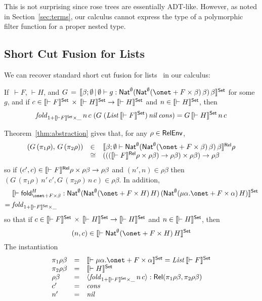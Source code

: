 \documentclass{lmcs}
\theoremstyle{plain}\newtheorem{satz}[thm]{Satz}
\newcommand{\fold}{\mathsf{fold}}
\begin{document}
\noindent
This is not surprising since rose trees are essentially
ADT-like. However, as noted in Section~\ref{sec:terms}, our calculus
cannot express the type of a polymorphic filter function for a proper
nested type.

\subsection{Short Cut Fusion for Lists}\label{sec:short-cut}

We can recover standard short cut fusion for lists~\cite{glp93} in our
calculus: 
\begin{thm}
If \,$\vdash F$, $\vdash H$, and 
$G \, = \, \setsem{\beta; \emptyset \,|\, \emptyset \vdash g :
  \Nat^{\emptyset} (\Nat^{\emptyset} (\onet + F \times \beta)\,
  \beta)\, \beta}$ for some $g$, and if $c \in \llbracket{\vdash F}\rrbracket^{\mathsf{Set}}
\,\times\, \llbracket{\vdash H}\rrbracket^{\mathsf{Set}} \to \llbracket{\vdash H}\rrbracket^{\mathsf{Set}}$ and $n \in
\llbracket{\vdash H}\rrbracket^{\mathsf{Set}}$, then
\[\mathit{fold}_{1 + \llbracket{\vdash F}\rrbracket^{\mathsf{Set}} \times \_}\, n\, c\; (G\; (\mathit{List}\,
\llbracket{\vdash F}\rrbracket^{\mathsf{Set}})\,\mathit{nil} \,\mathit{cons}) = G \,\llbracket{\vdash
  H}\rrbracket^{\mathsf{Set}}\, n\, c \]
\end{thm}
\proof
Theorem~\ref{thm:abstraction} gives
that, for any $\rho \in \mathsf{RelEnv}$,
\[\begin{array}{lll}
(G \,(\pi_1 \rho), \,G\, (\pi_2 \rho)) & \in 
& \relsem{\beta; \emptyset \vdash \Nat^{\emptyset} (\Nat^{\emptyset}
  (\onet + F \times \beta)\, \beta)\, \beta} \rho \\
& \cong & (((\relsem{\vdash F} \rho \times
\rho\beta) \to \rho\beta) \times \rho\beta) \to \rho\beta
\end{array}\]
so if $(c', c) \in \llbracket{\vdash F}\rrbracket^{\mathsf{Rel}} \rho \times
\rho\beta \to \rho\beta$ and $(n', n) \in \rho\beta$ then
$(G \,(\pi_1 \rho)\, n'\, c', G\, (\pi_2 \rho)\, n\, c)
\in \rho \beta$.
In addition,
\begin{align*}
  &\setsem{\vdash \fold_{\onet + F
    \times \beta}^{H} : \Nat^{\emptyset} (\Nat^{\emptyset} (\onet
  + F \times H)\, H)\, (\Nat^{\emptyset} (\mu \alpha. \onet
  + F \times \alpha)\, H)} \\ =\;
& \mathit{fold}_{1 + \setsem{\vdash F} \times \_}
\end{align*}
so that if $c \in
\llbracket{\vdash F}\rrbracket^{\mathsf{Set}} \,\times\, \llbracket{\vdash H}\rrbracket^{\mathsf{Set}} \to
\llbracket{\vdash H}\rrbracket^{\mathsf{Set}}$ and $n \in \llbracket{\vdash H}\rrbracket^{\mathsf{Set}}$,
 then
\[(n, c) \in \setsem{\vdash \Nat^{\emptyset} (\onet + F \times H)\,
  H}\] The instantiation
\[\begin{array}{lll}
\pi_1 \rho \beta & = & \setsem{\vdash \mu \alpha. \onet + F \times
  \alpha}=\mathit{List}\,\setsem{\vdash F}\\
\pi_2 \rho \beta & = & \setsem{\vdash H}\\
\rho \beta & = & \graph{\mathit{fold}_{1 + \setsem{\vdash F} \times \_}\, n\, c} :
\rel(\pi_1 \rho \beta, \pi_2 \rho \beta)\\
c' & = & \mathit{cons}\\
n' & = & \mathit{nil}
\end{array}\]
\end{document}
